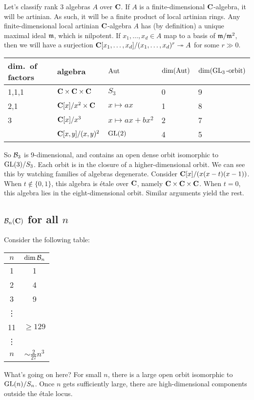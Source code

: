Let's classify rank $3$ algebras $A$ over $\mathbf{C}$. If $A$ is a finite-dimensional 
$\mathbf{C}$-algebra, it will be artinian. As such, it will be a finite product of 
local artinian rings. Any finite-dimensional local artinian $\mathbf{C}$-algebra $A$ 
has (by definition) a unique maximal ideal $\mathfrak{m}$, which is nilpotent. If 
$x_1,\dots,x_d\in A$ map to a basis of $\mathfrak{m}/\mathfrak{m}^2$, then we will have a 
surjection $\mathbf{C}[x_1,\dots,x_d]/(x_1,\dots,x_d)^r\twoheadrightarrow A$ for some 
$r\gg 0$. 
\begin{center}
\begin{tabular}{l|l|l|l|l}
dim.~of factors & algebra  & $\operatorname{Aut}$ & $\dim(\operatorname{Aut})$ & $\dim(\operatorname{GL}_3\text{-orbit})$ \\ \hline
1,1,1 & $\mathbf{C}\times \mathbf{C}\times \mathbf{C}$ & $S_3$ & 0 & 9\\
2,1 & $\mathbf{C}[x]/x^2\times \mathbf{C}$ & $x\mapsto a x$ & 1 & 8\\
3 & $\mathbf{C}[x]/x^3$ & $x\mapsto a x+b x^2$ & 2 & 7\\
& $\mathbf{C}[x,y]/(x,y)^2$ & $\operatorname{GL}(2)$ & 4 & 5\\
\end{tabular}
\end{center}
So $\mathcal{B}_3$ is $9$-dimensional, and contains an open dense orbit isomorphic to 
$\operatorname{GL}(3)/S_3$. Each orbit is in the closure of a higher-dimensional 
orbit. We can see this by watching families of algebras degenerate. Consider 
$\mathbf{C}[x]/(x(x-t)(x-1))$. When $t\notin \{0,1\}$, this algebra is \'etale over 
$\mathbf{C}$, namely $\mathbf{C}\times\mathbf{C}\times\mathbf{C}$. When $t=0$, this algebra lies in the 
eight-dimensional orbit. Similar arguments yield the rest. 





\subsection{\texorpdfstring{$\mathcal{B}_n(\mathbf{C})$}{BnC} for all \texorpdfstring{$n$}{n}}

Consider the following table: 
\begin{center}
\begin{tabular}{c|c}
$n$ & $\dim \mathcal{B}_n$ \\ \hline
1 & 1 \\
2 & 4 \\ 
3 & 9 \\
\vdots \\
11 & $\geqslant 129$ \\
\vdots \\
$n$ & $\sim \frac{2}{27} n^3$
\end{tabular}
\end{center}
What's going on here? For small $n$, there is a large open orbit isomorphic to 
$\operatorname{GL}(n)/S_n$. Once $n$ gets sufficiently large, there are 
high-dimensional components outside the \'etale locus. 

